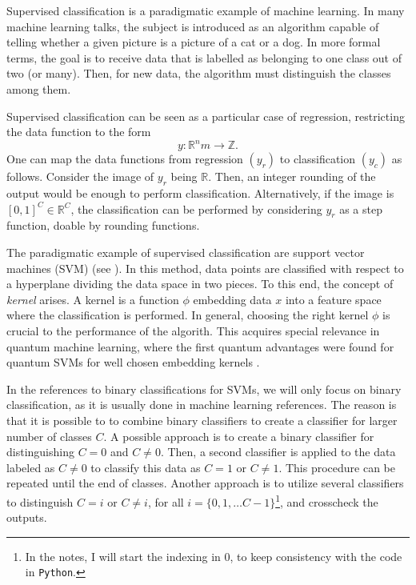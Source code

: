 \documentclass[]{report}
\begin{document}
Supervised classification is a paradigmatic example of machine learning. In many machine learning talks, the subject is introduced as an algorithm capable of telling whether a given picture is a picture of a cat or a dog. In more formal terms, the goal is to receive data that is labelled as belonging to one class out of two (or many). Then, for new data, the algorithm must distinguish the classes among them. 

Supervised classification can be seen as a particular case of regression, restricting the data function to the form
\begin{equation}
y: \mathbb R^nm \rightarrow \mathbb Z. 
\end{equation}
One can map the data functions from regression $(y_r)$ to classification $(y_c)$ as follows. Consider the image of $y_r$ being $\mathbb R$. Then, an integer rounding of the output would be enough to perform classification. Alternatively, if the image is $[0, 1]^C \in \mathbb R^C$, the classification can be performed by considering $y_r$ as a step function, doable by rounding functions. 

The paradigmatic example of supervised classification are support vector machines (SVM) (see ). In this method, data points are classified with respect to a hyperplane dividing the data space in two pieces. To this end, the concept of \textit{kernel} arises. A kernel is a function $\phi$ embedding data $x$ into a feature space where the classification is performed. In general, choosing the right kernel $\phi$ is crucial to the performance of the algorith. This acquires special relevance in quantum machine learning, where the first quantum advantages were found for quantum SVMs for well chosen embedding kernels \cite{liu2021rigorous}.

In the references to binary classifications for SVMs, we will only focus on binary classification, as it is usually done in machine learning references. The reason is that it is possible to to combine binary classifiers to create a classifier for larger number of classes $C$. A possible approach is to create a binary classifier for distinguishing $C = 0$ and $C \neq 0$. Then, a second classifier is applied to the data labeled as $C \neq 0$ to classify this data as $C = 1$ or $C \neq 1$. This procedure can be repeated until the end of classes. Another approach is to utilize several classifiers to distinguish $C = i$ or $C \neq i$, for all $i = \{0, 1,\ldots C - 1\}$\footnote{In the notes, I will start the indexing in $0$, to keep consistency with the code in \texttt{Python}.}, and crosscheck the outputs. 
\end{document}
